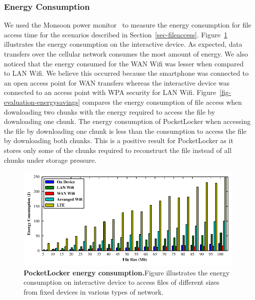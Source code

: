 \subsubsection{Energy Consumption}
We used the Monsoon power monitor~\cite{monsoon} to measure the energy consumption for file
access time for the scenarios described in Section~\ref{sec-fileaccess}.
Figure~\ref{fig-evaluation-energy} illustrates the energy consumption on the
interactive device. As expected, data transfers over the cellular network 
consumes the most amount of
energy. We also noticed that the energy consumed for the WAN Wifi was lesser
when compared to LAN Wifi. We believe this occurred because
the smartphone was connected to an open access point for WAN transfers whereas
the interactive device was connected to an access point with WPA security for LAN
Wifi. Figure~\ref{fig-evaluation-energysavings} compares the energy consumption
of file access when downloading two chunks with the energy required to access
the file by downloading one chunk. The energy consumption of PocketLocker when
accessing the file by downloading one chunk is less than the consumption to access
the file by downloading both chunks. This is a positive result for
PocketLocker as it stores only some of the chunks required to reconstruct the 
file instead of all chunks under storage pressure.


\begin{figure}[t]

  \includegraphics[width=\textwidth]{./figures/energyconsumption.pdf}

  \caption{\small \textbf{PocketLocker energy consumption.}Figure illustrates the energy
  consumption on interactive device to access files of different sizes from
fixed devices in various types of network.}

  \label{fig-evaluation-energy}

\end{figure}


